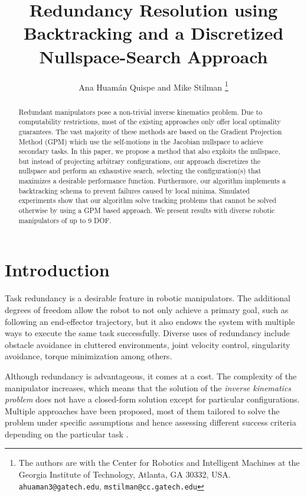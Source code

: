 \documentclass[conference]{IEEEtran}
\begin{document}
\title{Redundancy Resolution using Backtracking and a Discretized Nullspace-Search Approach}
\author{Ana Huam\'an Quispe and Mike Stilman%
  \thanks{The authors are with the Center for Robotics and Intelligent
    Machines at the Georgia Institute of Technology, Atlanta, GA
    30332, USA. {\tt\small ahuaman3@gatech.edu}, {\tt\small mstilman@cc.gatech.edu}}}
\maketitle

\begin{abstract}
Redundant manipulators pose a non-trivial inverse kinematics problem.
Due to computability restrictions, most of the existing approaches only offer
local optimality guarantees. The vast majority of these methods are based on the Gradient
Projection Method (GPM)\cite{liegeois-ns-1977} which use the self-motions in the
Jacobian nullspace to achieve secondary tasks. In this paper, we propose a method that 
also exploits the nullspace, but instead of projecting arbitrary configurations, our approach 
discretizes the nullspace and perform an exhaustive search, selecting the configuration(s) that maximizes
a desirable performance function. Furthermore, our algorithm implements a backtracking schema 
to prevent failures caused by local minima. Simulated experiments show that our algorithm solve
tracking problems that cannot be solved otherwise by using a GPM based approach.
We present results with diverse robotic manipulators of up to 9 DOF.  
\end{abstract}

\section{Introduction}
Task redundancy is a desirable feature in robotic manipulators. The 
additional degrees of freedom allow the robot to not only achieve
a primary goal, such as following an end-effector trajectory, but 
it also endows the system with multiple ways to execute the same 
task successfully. Diverse uses of redundancy include obstacle 
avoidance in cluttered environments, joint velocity control,
singularity avoidance, torque minimization among others.

Although redundancy is advantageous, it comes at a
 cost. The complexity of the manipulator increases, which means
that the solution of the \emph{inverse kinematics problem} does not have
a closed-form solution except for particular configurations.
Multiple approaches have been proposed, most of them tailored to
solve the problem under specific assumptions and hence assessing different
success criteria depending on the particular task \cite{hooper-ns-1995}. 
\end{document}
